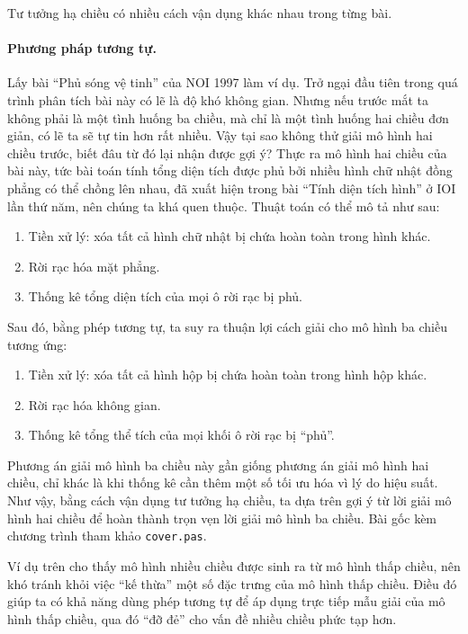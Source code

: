 \documentclass[11pt]{article}
\begin{document}
Tư tưởng hạ chiều có nhiều cách vận dụng khác nhau trong từng bài.

\paragraph{Phương pháp tương tự.}
Lấy bài ``Phủ sóng vệ tinh'' của NOI 1997 làm ví dụ. Trở ngại đầu tiên trong
quá trình phân tích bài này có lẽ là độ khó không gian. Nhưng nếu trước mắt
ta không phải là một tình huống ba chiều, mà chỉ là một tình huống hai chiều
đơn giản, có lẽ ta sẽ tự tin hơn rất nhiều. Vậy tại sao không thử giải mô
hình hai chiều trước, biết đâu từ đó lại nhận được gợi ý? Thực ra mô hình hai
chiều của bài này, tức bài toán tính tổng diện tích được phủ bởi nhiều hình
chữ nhật đồng phẳng có thể chồng lên nhau, đã xuất hiện trong bài ``Tính diện
tích hình'' ở IOI lần thứ năm, nên chúng ta khá quen thuộc. Thuật toán có thể
mô tả như sau:

\begin{enumerate}
  \item Tiền xử lý: xóa tất cả hình chữ nhật bị chứa hoàn toàn trong hình
  khác.
  \item Rời rạc hóa mặt phẳng.
  \item Thống kê tổng diện tích của mọi ô rời rạc bị phủ.
\end{enumerate}

Sau đó, bằng phép tương tự, ta suy ra thuận lợi cách giải cho mô hình ba
chiều tương ứng:

\begin{enumerate}
  \item Tiền xử lý: xóa tất cả hình hộp bị chứa hoàn toàn trong hình hộp
  khác.
  \item Rời rạc hóa không gian.
  \item Thống kê tổng thể tích của mọi khối ô rời rạc bị ``phủ''.
\end{enumerate}

Phương án giải mô hình ba chiều này gần giống phương án giải mô hình hai
chiều, chỉ khác là khi thống kê cần thêm một số tối ưu hóa vì lý do hiệu
suất. Như vậy, bằng cách vận dụng tư tưởng hạ chiều, ta dựa trên gợi ý từ lời
giải mô hình hai chiều để hoàn thành trọn vẹn lời giải mô hình ba chiều. Bài
gốc kèm chương trình tham khảo \texttt{cover.pas}.

Ví dụ trên cho thấy mô hình nhiều chiều được sinh ra từ mô hình thấp chiều,
nên khó tránh khỏi việc ``kế thừa'' một số đặc trưng của mô hình thấp chiều.
Điều đó giúp ta có khả năng dùng phép tương tự để áp dụng trực tiếp mẫu giải
của mô hình thấp chiều, qua đó ``đỡ đẻ'' cho vấn đề nhiều chiều phức tạp hơn.
\end{document}
